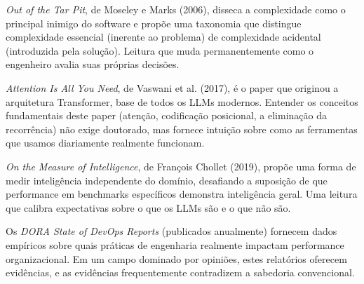 \textit{Out of the Tar Pit}, de Moseley e Marks (2006), disseca a complexidade como o principal inimigo do software e propõe uma taxonomia que distingue complexidade essencial (inerente ao problema) de complexidade acidental (introduzida pela solução). Leitura que muda permanentemente como o engenheiro avalia suas próprias decisões.

\textit{Attention Is All You Need}, de Vaswani et al. (2017), é o paper que originou a arquitetura Transformer, base de todos os LLMs modernos. Entender os conceitos fundamentais deste paper (atenção, codificação posicional, a eliminação da recorrência) não exige doutorado, mas fornece intuição sobre como as ferramentas que usamos diariamente realmente funcionam.

\textit{On the Measure of Intelligence}, de François Chollet (2019), propõe uma forma de medir inteligência independente do domínio, desafiando a suposição de que performance em benchmarks específicos demonstra inteligência geral. Uma leitura que calibra expectativas sobre o que os LLMs são e o que não são.

Os \textit{DORA State of DevOps Reports} (publicados anualmente) fornecem dados empíricos sobre quais práticas de engenharia realmente impactam performance organizacional. Em um campo dominado por opiniões, estes relatórios oferecem evidências, e as evidências frequentemente contradizem a sabedoria convencional.
